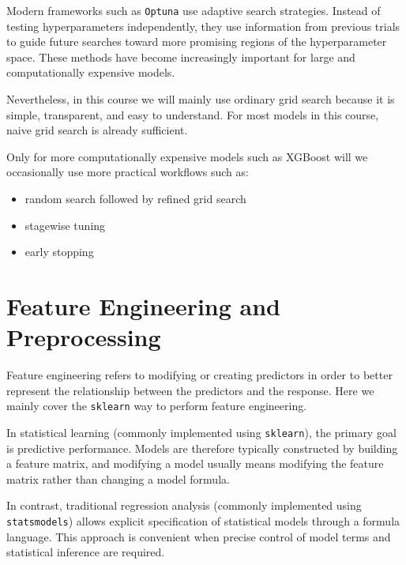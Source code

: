 \documentclass[
  letterpaper,
  DIV=11,
  numbers=noendperiod]{scrreprt}
\providecommand{\tightlist}{%
  \setlength{\itemsep}{0pt}\setlength{\parskip}{0pt}}
\theoremstyle{definition}
\theoremstyle{definition}
\theoremstyle{plain}
\theoremstyle{plain}
\theoremstyle{remark}
\begin{document}
Modern frameworks such as \texttt{Optuna} use adaptive search
strategies. Instead of testing hyperparameters independently, they use
information from previous trials to guide future searches toward more
promising regions of the hyperparameter space. These methods have become
increasingly important for large and computationally expensive models.

Nevertheless, in this course we will mainly use ordinary grid search
because it is simple, transparent, and easy to understand. For most
models in this course, naive grid search is already sufficient.

Only for more computationally expensive models such as XGBoost will we
occasionally use more practical workflows such as:

\begin{itemize}
\tightlist
\item
  random search followed by refined grid search
\item
  stagewise tuning
\item
  early stopping
\end{itemize}

\section{Feature Engineering and
Preprocessing}\label{feature-engineering-and-preprocessing}

Feature engineering refers to modifying or creating predictors in order
to better represent the relationship between the predictors and the
response. Here we mainly cover the \texttt{sklearn} way to perform
feature engineering.

\begin{tcolorbox}[enhanced jigsaw, arc=.35mm, bottomrule=.15mm, bottomtitle=1mm, breakable, colback=white, colbacktitle=quarto-callout-note-color!10!white, colframe=quarto-callout-note-color-frame, coltitle=black, left=2mm, leftrule=.75mm, opacityback=0, opacitybacktitle=0.6, rightrule=.15mm, title=\textcolor{quarto-callout-note-color}{\faInfo}\hspace{0.5em}{Modeling Perspective}, titlerule=0mm, toprule=.15mm, toptitle=1mm]

In statistical learning (commonly implemented using \texttt{sklearn}),
the primary goal is predictive performance. Models are therefore
typically constructed by building a feature matrix, and modifying a
model usually means modifying the feature matrix rather than changing a
model formula.

In contrast, traditional regression analysis (commonly implemented using
\texttt{statsmodels}) allows explicit specification of statistical
models through a formula language. This approach is convenient when
precise control of model terms and statistical inference are required.

\end{tcolorbox}
\end{document}
